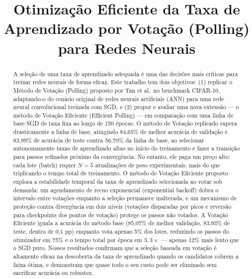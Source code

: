 \documentclass[conference]{IEEEtran}
\begin{document}
\title{Otimização Eficiente da Taxa de Aprendizado por Votação (Polling) para Redes Neurais}

\author{
\and
{}
}

\maketitle

\begin{abstract}
A seleção de uma taxa de aprendizado adequada é uma das decisões mais críticas para treinar redes neurais de forma eficaz. Este trabalho tem dois objetivos: (1) replicar o Método de Votação (Polling) proposto por Tan et al.\ no benchmark CIFAR-10, adaptando-o do cenário original de redes neurais artificiais (ANN) para uma rede neural convolucional treinada com SGD, e (2) propor e avaliar uma nova extensão --- o método de Votação Eficiente (Efficient Polling) --- em comparação com uma linha de base SGD de taxa fixa ao longo de 150 épocas. O método de Votação replicado supera drasticamente a linha de base, atingindo 84,65\% de melhor acurácia de validação e 83,99\% de acurácia de teste contra 56,70\% da linha de base, ao selecionar autonomamente taxas de aprendizado altas no início do treinamento e fazer a transição para passos refinados próximo da convergência. No entanto, ele paga um preço alto: cada lote (batch) requer $N=5$ atualizações de peso experimentais, mais do que triplicando o tempo total de treinamento. O método de Votação Eficiente proposto explora a estabilidade temporal da taxa de aprendizado selecionada ao votar sob demanda: um agendamento de recuo exponencial (exponential backoff) dobra o intervalo entre votações enquanto a seleção permanece inalterada, e um mecanismo de proteção contra divergência em dois níveis (votações disparadas por picos e reversão para checkpoints dos pontos de votação) protege os passos não votados. A Votação Eficiente iguala a acurácia do método base (85,07\% de melhor validação, 83,93\% de teste, dentro de 0,1 pp) enquanto vota apenas 5\% dos lotes, reduzindo os passos do otimizador em 75\% e o tempo total por época em $3,3\times$ --- apenas 12\% mais lento que o SGD puro. Nossos resultados confirmam que a seleção baseada em votação é altamente eficaz na descoberta da taxa de aprendizado quando os candidatos cobrem a faixa ótima, e demonstram que quase todo o seu custo pode ser eliminado sem sacrificar acurácia ou robustez.
\end{abstract}
\end{document}
